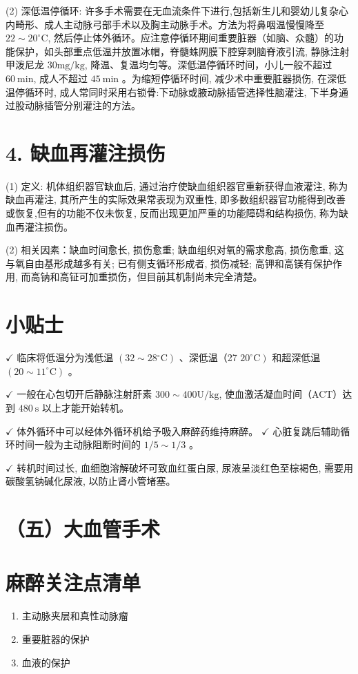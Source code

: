 \documentclass[10pt]{article}
\begin{document}
(2) 深低温停循环: 许多手术需要在无血流条件下进行,包括新生儿和婴幼儿复杂心内畸形、成人主动脉弓部手术以及胸主动脉手术。方法为将鼻咽温慢慢降至 $22 \sim 20^{\circ} \mathrm{C}$, 然后停止体外循环。应注意停循环期间重要脏器（如脑、众髓）的功能保护，如头部重点低温并放置冰帽，脊髓蛛网膜下腔穿刺脑脊液引流, 静脉注射甲泼尼龙 $30 \mathrm{mg} / \mathrm{kg}$, 降温、复温均匀等。深低温停循环时间，小儿一般不超过 $60 \mathrm{~min}$, 成人不超过 $45 \mathrm{~min}$ 。为缩短停循环时间, 减少术中重要脏器损伤, 在深低温停循环时, 成人常同时采用右锁骨:下动脉或腋动脉插管选择性脑灌注, 下半身通过股动脉插管分别灌注的方法。

\section*{4. 缺血再灌注损伤}
(1) 定义: 机体组织器官缺血后, 通过治疗使缺血组织器官重新获得血液灌注, 称为缺血再灌注, 其所产生的实际效果常表现为双重性, 即多数组织器官功能得到改善或恢复,但有的功能不仅未恢复, 反而出现更加严重的功能障碍和结构损伤, 称为缺血再灌注损伤。

(2) 相关因素：缺血时间愈长, 损伤愈重; 缺血组织对氧的需求愈高, 损伤愈重, 这与氧自由基形成越多有关; 已有侧支循环形成者, 损伤减轻; 高钾和高镁有保护作用, 而高钠和高钲可加重损伤，但目前其机制尚未完全清楚。

\section*{小贴士}
$\checkmark$ 临床将低温分为浅低温 $\left(32 \sim 28{ }^{\circ} \mathrm{C}\right)$ 、深低温（27 $\left.20^{\circ} \mathrm{C}\right)$ 和超深低温 $\left(20 \sim 11^{\circ} \mathrm{C}\right)$ 。

$\checkmark$ 一般在心包切开后静脉注射肝素 $300 \sim 400 \mathrm{U} / \mathrm{kg}$, 使血激活凝血时间（ACT）达到 $480 \mathrm{~s}$ 以上才能开始转机。

$\checkmark$ 体外循环中可以经体外循环机给予吸入麻醉药维持麻醉。 $\checkmark$ 心脏复跳后辅助循环时间一般为主动脉阻断时间的 $1 / 5 \sim 1 / 3$ 。

$\checkmark$ 转机时间过长, 血细胞溶解破坏可致血红蛋白尿, 尿液呈淡红色至棕褐色, 需要用碳酸氢钠碱化尿液, 以防止肾小管堵塞。

\section*{（五）大血管手术}
\section*{麻醉关注点清单}
\begin{enumerate}
  \item 主动脉夹层和真性动脉瘤

  \item 重要脏器的保护

  \item 血液的保护

\end{enumerate}
\end{document}

